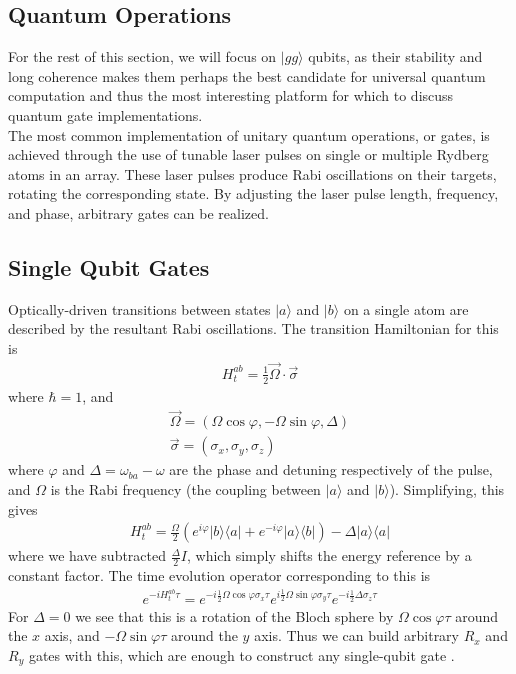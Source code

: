 \documentclass[aps,twocolumn,preprintnumbers]{revtex4}
\newcommand{\eq}{\begin{equation}\begin{aligned}}
\newcommand{\qe}{\end{aligned}\end{equation}}
\newcommand{\bra}[1]{\langle #1|}
\newcommand{\ket}[1]{|#1\rangle}
\begin{document}
\subsection{Quantum Operations}

For the rest of this section, we will focus on $\ket{gg}$ qubits, as their stability and long coherence makes them perhaps the best candidate for universal quantum computation and thus the most interesting platform for which to discuss quantum gate implementations.\\
The most common implementation of unitary quantum operations, or gates, is achieved through the use of tunable laser pulses on single or multiple Rydberg atoms in an array. These laser pulses produce Rabi oscillations on their targets, rotating the corresponding state. By adjusting the laser pulse length, frequency, and phase, arbitrary gates can be realized. \\

\subsection{Single Qubit Gates}

Optically-driven transitions between states $\ket{a}$ and $\ket{b}$ on a single atom are described by the resultant Rabi oscillations. The transition Hamiltonian for this is \cite{pulser}
\eq
  H^{ab}_t=\frac{1}{2}\vec{\Omega}\cdot\vec{\sigma}
\qe
where $\hbar=1$, and
\eq
  \vec{\Omega}=(\Omega \cos\varphi, -\Omega\sin\varphi, \Delta)\\
  \vec{\sigma}=(\sigma_x,\sigma_y,\sigma_z)
\qe
where $\varphi$ and $\Delta=\omega_{ba}-\omega$ are the phase and detuning respectively of the pulse, and $\Omega$ is the Rabi frequency (the coupling between $\ket{a}$ and $\ket{b}$). Simplifying, this gives
\eq
  H^{ab}_t=\frac{\Omega}{2}(e^{i\varphi}\ket{b}\bra{a}+e^{-i\varphi}\ket{a}\bra{b})-\Delta\ket{a}\bra{a}
\qe
where we have subtracted $\frac{\Delta}{2} I$, which simply shifts the energy reference by a constant factor. The time evolution operator corresponding to this is
\eq
  e^{-iH_t^{ab}\tau}=e^{-i\frac{1}{2}\Omega\cos\varphi\sigma_x\tau}e^{i\frac{1}{2}\Omega\sin\varphi\sigma_y\tau}e^{-i\frac{1}{2}\Delta\sigma_z\tau}
  \label{eq:time}
\qe
For $\Delta=0$ we see that this is a rotation of the Bloch sphere by $\Omega\cos\varphi\tau$ around the $x$ axis, and $-\Omega\sin\varphi\tau$ around the $y$ axis. Thus we can build arbitrary $R_x$ and $R_y$ gates with this, which are enough to construct any single-qubit gate \cite{shor}.
\end{document}
